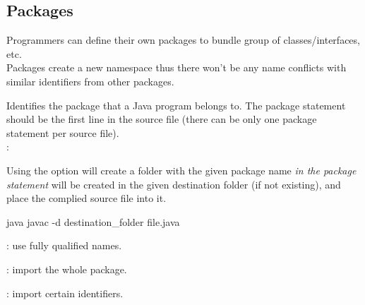 \subsection{Packages}
\begin{sectionbox}\nospacing
  Programmers can define their own packages to bundle group of
  classes/interfaces, etc.\\
  Packages create a new namespace thus there won't be any name conflicts with
  similar identifiers from other packages.
\end{sectionbox}
\begin{defnbox}\nospacing
  \begin{defn}
    Identifies the package that a Java program belongs to.
    The package statement should be the first line in the source file
    (there can be only one package statement per source file).\\
    :\hfil {}
  \end{defn}
\end{defnbox}
\begin{sectionbox}\nospacing
  Using the  option will create a folder with
  the given package name \textit{in the package statement} will be created in
  the given destination folder (if not existing), and place the complied source file
  into it.
  \begin{mintlinebox}{java}
		javac -d destination_folder file.java
  \end{mintlinebox}
\end{sectionbox}
\begin{sectionbox}\nospacing
  \begin{itemizenosep}
      \item {}: use fully qualified names.
    	\item {}: import the whole package.
    	\item {}: import certain identifiers.
  \end{itemizenosep}
\end{sectionbox}
